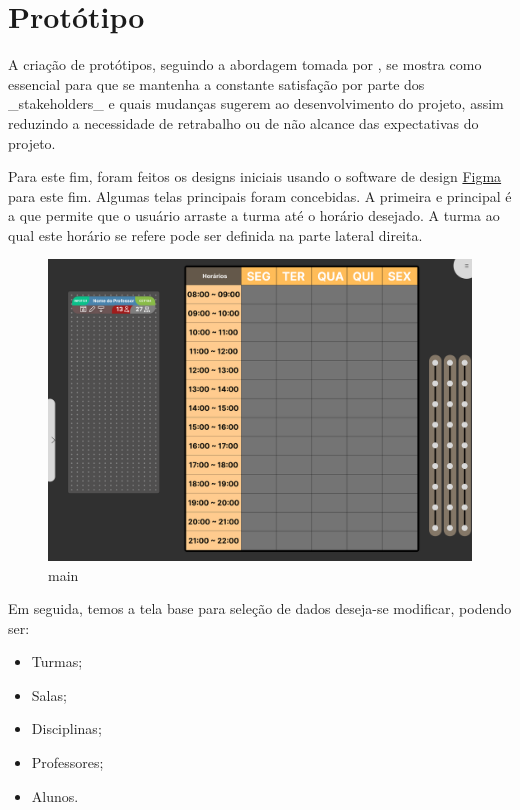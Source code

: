 \section{Protótipo} %

    A criação de protótipos, seguindo a abordagem tomada por \cite{andre_interaction_2018}, se mostra como essencial para que se mantenha a constante satisfação por parte dos _stakeholders_ e quais mudanças sugerem ao desenvolvimento do projeto, assim reduzindo a necessidade de retrabalho ou de não alcance das expectativas do projeto.

    Para este fim, foram feitos os designs iniciais usando o software de design \href{https://www.figma.com/}{Figma} para este fim. Algumas telas principais foram concebidas. A primeira e principal é a que permite que o usuário arraste a turma até o horário desejado. A turma ao qual este horário se refere pode ser definida na parte lateral direita.

    \begin{figure}[htbp]\centering
        \caption{\label{fig:main} main}
        \includegraphics[scale=0.8]{files/img/Prototipo/main.png}
    \end{figure} %

    Em seguida, temos a tela base para seleção de dados deseja-se modificar, podendo ser:

    \begin{itemize}
        \item Turmas;
        \item Salas;
        \item Disciplinas;
        \item Professores;
        \item Alunos.
    \end{itemize}

